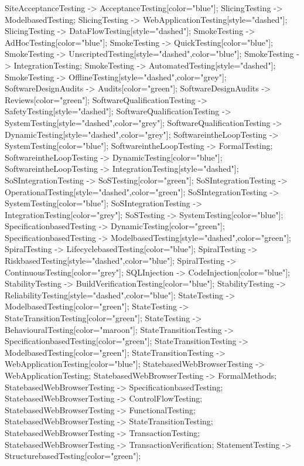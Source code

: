 \documentclass{article}
\begin{document}
{SiteAcceptanceTesting -> AcceptanceTesting[color="blue"];
SlicingTesting -> ModelbasedTesting;
SlicingTesting -> WebApplicationTesting[style="dashed"];
SlicingTesting -> DataFlowTesting[style="dashed"];
SmokeTesting -> AdHocTesting[color="blue"];
SmokeTesting -> QuickTesting[color="blue"];
SmokeTesting -> UnscriptedTesting[style="dashed",color="blue"];
SmokeTesting -> IntegrationTesting;
SmokeTesting -> AutomatedTesting[style="dashed"];
SmokeTesting -> OfflineTesting[style="dashed",color="grey"];
SoftwareDesignAudits -> Audits[color="green"];
SoftwareDesignAudits -> Reviews[color="green"];
SoftwareQualificationTesting -> SafetyTesting[style="dashed"];
SoftwareQualificationTesting -> SystemTesting[style="dashed",color="grey"];
SoftwareQualificationTesting -> DynamicTesting[style="dashed",color="grey"];
SoftwareintheLoopTesting -> SystemTesting[color="blue"];
SoftwareintheLoopTesting -> FormalTesting;
SoftwareintheLoopTesting -> DynamicTesting[color="blue"];
SoftwareintheLoopTesting -> IntegrationTesting[style="dashed"];
SoSIntegrationTesting -> SoSTesting[color="green"];
SoSIntegrationTesting -> OperationalTesting[style="dashed",color="green"];
SoSIntegrationTesting -> SystemTesting[color="blue"];
SoSIntegrationTesting -> IntegrationTesting[color="grey"];
SoSTesting -> SystemTesting[color="blue"];
SpecificationbasedTesting -> DynamicTesting[color="green"];
SpecificationbasedTesting -> ModelbasedTesting[style="dashed",color="green"];
SpiralTesting -> LifecyclebasedTesting[color="blue"];
SpiralTesting -> RiskbasedTesting[style="dashed",color="blue"];
SpiralTesting -> ContinuousTesting[color="grey"];
SQLInjection -> CodeInjection[color="blue"];
StabilityTesting -> BuildVerificationTesting[color="blue"];
StabilityTesting -> ReliabilityTesting[style="dashed",color="blue"];
StateTesting -> ModelbasedTesting[color="green"];
StateTesting -> StateTransitionTesting[color="green"];
StateTesting -> BehaviouralTesting[color="maroon"];
StateTransitionTesting -> SpecificationbasedTesting[color="green"];
StateTransitionTesting -> ModelbasedTesting[color="green"];
StateTransitionTesting -> WebApplicationTesting[color="blue"];
StatebasedWebBrowserTesting -> WebApplicationTesting;
StatebasedWebBrowserTesting -> FormalMethods;
StatebasedWebBrowserTesting -> SpecificationbasedTesting;
StatebasedWebBrowserTesting -> ControlFlowTesting;
StatebasedWebBrowserTesting -> FunctionalTesting;
StatebasedWebBrowserTesting -> StateTransitionTesting;
StatebasedWebBrowserTesting -> TransactionTesting;
StatebasedWebBrowserTesting -> TransactionVerification;
StatementTesting -> StructurebasedTesting[color="green"];
}
\end{document}
